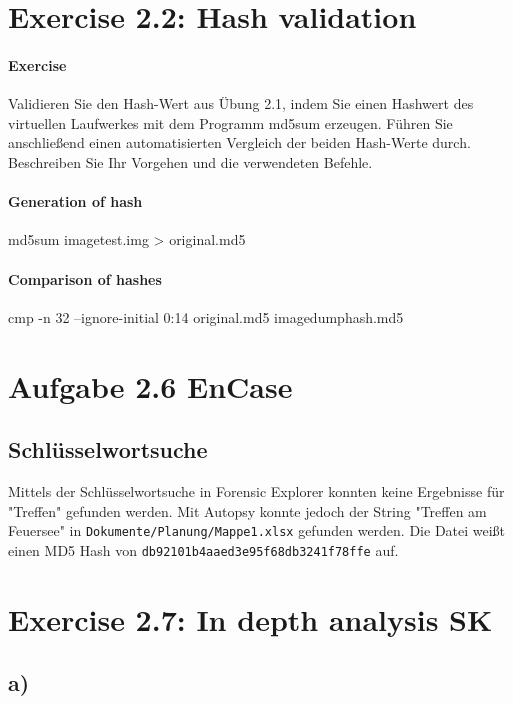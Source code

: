 \documentclass[10pt,a4paper]{article}
\begin{document}

\section{Exercise 2.2: Hash validation}

\paragraph{Exercise}
Validieren Sie den Hash-Wert aus Übung 2.1, indem Sie einen Hashwert des virtuellen Laufwerkes mit dem Programm
md5sum erzeugen. Führen Sie anschließend einen automatisierten Vergleich der beiden Hash-Werte durch. Beschreiben
Sie Ihr Vorgehen und die verwendeten Befehle.

\paragraph{Generation of hash}
md5sum imagetest.img > original.md5

\paragraph{Comparison of hashes}
cmp -n 32 --ignore-initial 0:14 original.md5 imagedumphash.md5




\section{Aufgabe 2.6 EnCase}
\subsection{Schlüsselwortsuche}
Mittels der Schlüsselwortsuche in Forensic Explorer konnten keine Ergebnisse für "Treffen" gefunden werden. Mit Autopsy konnte jedoch der String "Treffen am Feuersee" in \Verb+Dokumente/Planung/Mappe1.xlsx+ gefunden werden. Die Datei weißt einen MD5 Hash von \Verb+db92101b4aaed3e95f68db3241f78ffe+ auf.

\section{Exercise 2.7: In depth analysis SK}
\subsection{a)}
\end{document}
